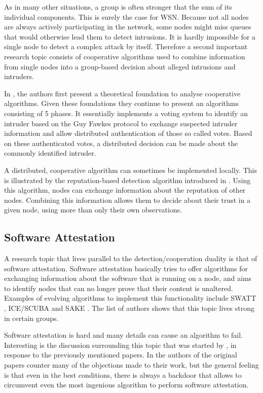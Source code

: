\documentclass[conference]{IEEEtran}
\begin{document}
As in many other situations, a group is often stronger that the sum of its
individual components. This is surely the case for WSN. Because not all nodes
are always actively participating in the network, some nodes might miss queues
that would otherwise lead them to detect intrusions. It is hardly impossible
for a single node to detect a complex attack by itself. Therefore a second
important research topic consists of cooperative algorithms used to combine
information from single nodes into a group-based decision about alleged
intrusions and intruders.

In \cite{krontiris2009cooperative}, the authors first present a theoretical
foundation to analyse cooperative algorithms. Given these foundations they
continue to present an algorithms consisting of 5 phases. It essentially
implements a voting system to identify an intruder based on the Guy Fawkes
protocol \cite{anderson1998new} to exchange suspected intruder information and
allow distributed authentication of those so called votes. Based on these
authenticated votes, a distributed decision can be made about the commonly
identified intruder.

A distributed, cooperative algorithm can sometimes be implemented locally. This
is illustrated by the reputation-based detection algorithm introduced in
\cite{ganeriwal2008reputation}. Using this algorithm, nodes can exchange
information about the reputation of other nodes. Combining this information
allows them to decide about their trust in a given node, using more than only
their own observations.

\subsection{Software Attestation}
\label{subsection:attestation}

A research topic that lives parallel to the detection/cooperation duality is
that of software attestation. Software attestation basically tries to offer
algorithms for exchanging information about the software that is running on a
node, and aims to identify nodes that can no longer prove that their content is
unaltered. Examples of evolving algorithms to implement this functionality
include SWATT \cite{seshadri2004swatt}, ICE/SCUBA \cite{seshadri2006scuba} and
SAKE \cite{seshadri2008sake}. The list of authors shows that this topic lives
strong in certain groups.

Software attestation is hard and many details can cause an algorithm to fail.
Interesting is the discussion surrounding this topic that was started by
\cite{castelluccia2009difficulty}, in response to the previously mentioned
papers. In \cite{perrig2010refutation} the authors of the original papers
counter many of the objections made to their work, but the general feeling is
that even in the best conditions, there is always a backdoor that allows to
circumvent even the most ingenious algorithm to perform software attestation.
\end{document}
